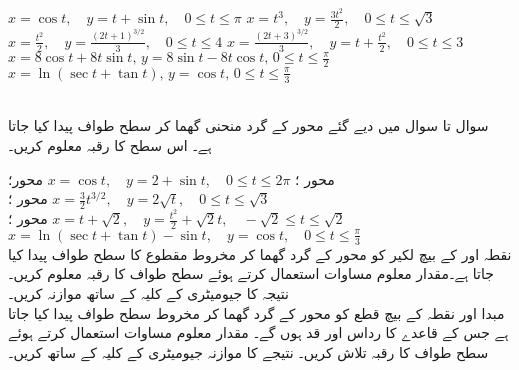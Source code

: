 $x=\cos t,\quad y=t+\sin t,\quad 0\le t\le \pi$
$x=t^3,\quad y=\frac{3t^2}{2},\quad 0\le t\le \sqrt{3}$
$x=\frac{t^2}{2},\quad y=\frac{(2t+1)^{3/2}}{3},\quad 0\le t\le 4$
$x=\frac{(2t+3)^{3/2}}{3},\quad y=t+\frac{t^2}{2},\quad 0\le t\le 3$
$x=8\cos t+8t\sin t,\, y=8\sin t-8t\cos t,\, 0\le t\le \frac{\pi}{2}$
$x=\ln(\sec t+\tan t),\, y=\cos t,\, 0\le t\le \frac{\pi}{3}$

\\
سوال  تا سوال  میں دیے گئے محور کے گرد منحنی گھما کر سطح طواف پیدا کیا جاتا ہے۔ اس سطح کا رقبہ معلوم کریں۔

محور ؛ \quad
$x=\cos t,\quad y=2+\sin t,\quad 0\le t\le 2\pi$
محور؛ \quad
$x=\frac{3}{2}t^{3/2},\quad y=2\sqrt{t},\quad 0\le t\le \sqrt{3}$
محور ؛ \quad
$x=t+\sqrt{2},\quad y=\frac{t^2}{2}+\sqrt{2}t,\quad -\sqrt{2}\le t\le \sqrt{2}$
محور ؛ \quad
$x=\ln(\sec t+\tan t)-\sin t,\quad y=\cos t,\quad 0\le t\le \frac{\pi}{3}$
\\
نقطہ  اور  کے بیچ لکیر کو محور  کے گرد گھما کر مخروط مقطوع کا سطح طواف پیدا کیا جاتا ہے۔مقدار معلوم مساوات  استعمال کرتے ہوئے سطح طواف کا رقبہ معلوم کریں۔ نتیجہ کا جیومیٹری کے کلیہ  کے ساتھ موازنہ کریں۔
\\
مبدا اور نقطہ  کے بیچ قطع کو محور  کے گرد گھما کر مخروط سطح طواف پیدا کیا جاتا ہے جس کے قاعدے کا رداس  اور  قد  ہوں گے۔ مقدار معلوم مساوات  استعمال کرتے ہوئے سطح طواف کا رقبہ تلاش کریں۔  نتیجے کا موازنہ جیومیٹری کے کلیہ  کے ساتھ کریں۔

